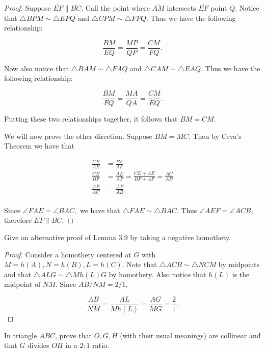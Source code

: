 \documentclass[letterpaper,oneside]{scrartcl}
\begin{document}
\begin{proof}
  Suppose $\overline{EF} \parallel \overline{BC}.$ Call the point where $\overline{AM}$ intersects $\overline{EF}$ point $Q.$ Notice that $\triangle BPM \sim \triangle EPQ$ and $\triangle CPM \sim \triangle FPQ.$ Thus we have the following relationship:

  $$\frac{BM}{EQ} = \frac{MP}{QP} = \frac{CM}{FQ}.$$

  Now also notice that $\triangle BAM \sim \triangle FAQ$ and $\triangle CAM \sim \triangle EAQ.$ Thus we have the following relationship:

  $$\frac{BM}{FQ} = \frac{MA}{QA} = \frac{CM}{EQ}.$$

  Putting these two relationships together, it follows that $BM=CM.$

  We will now prove the other direction. Suppose $BM=MC.$ Then by Ceva's Theorem we have that

  \begin{align*}
    \frac{CE}{AE} & =\frac{BF}{AF}                                     \\
    \frac{CE}{BF} & =\frac{AE}{AF} = \frac{CE+AE}{BF+AF}=\frac{AC}{AB} \\
    \frac{AE}{AC} & =\frac{AF}{AB}.                                    \\
  \end{align*}

  Since $\angle FAE=\angle BAC,$ we have that $\triangle FAE \sim \triangle BAC.$ Thus $\angle AEF = \angle ACB,$ therefore $\overline{EF} \parallel \overline{BC}.$
\end{proof}

\begin{problem*}
  [3.12]
  Give an alternative proof of Lemma 3.9 by taking a negative homothety.
\end{problem*}
\begin{proof}
  Consider a homothety centered at $G$ with $M=h(A), N=h(B), L = h(C).$ Note that $\triangle ACB \sim \triangle NCM$ by midpoints and that $\triangle {ALG} \sim \triangle {Mh(L)G}$ by homothety. Also notice that $h(L)$ is the midpoint of $NM.$ Since ${AB}/{NM} = 2/1,$

  $$\frac{AB}{NM} = \frac{AL}{Mh(L)} = \frac{AG}{MG} = \frac21.$$
\end{proof}



\begin{lemma*}
  In triangle $ABC$, prove that $O, G, H$ (with their usual meanings) are collinear and that $G$ divides $\overline{OH}$ in a $2:1$ ratio.
\end{lemma*}
\end{document}
